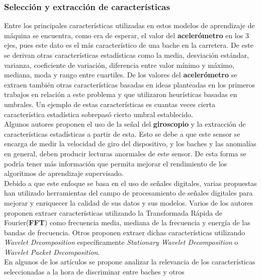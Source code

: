 		\subsubsection{Selección y extracción de características}
			Entre los principales características utilizadas en estos modelos de aprendizaje de máquina se encuentra, como era de esperar, el valor 
			del \textbf{acelerómetro} en los 3 ejes, pues este dato es el más característico de una bache en la carretera. De este se derivan otras
			características estadísticas como la media, desviación estándar, varianza, coeficiente de variación, diferencia entre valor mínimo y
			máximo, mediana, moda y rango entre cuartiles. De los valores del \textbf{acelerómetro} se extraen también otras características basadas en ideas planteadas en los primeros
			trabajos en relación a este problema y que utilizaron heurísticas basadas en umbrales. Un ejemplo de estas características es cuantas  veces
			cierta característica estadística sobrepasó cierto umbral establecido.\\
			\indent Algunos autores proponen el uso de la señal del \textbf{giroscopio} y la extracción de características estadísticas a partir de esta.
			Esto se debe a que este sensor se encarga de medir la velocidad de giro del dispositivo, y los baches y las anomalías en general, deben producir
			lecturas anormales de este sensor. De esta forma se podría tener más información que permita mejorar el rendimiento de los algoritmos de aprendizaje
			supervisado.\\
			\indent Debido a que este enfoque se basa en el uso de señales digitales, varias propuestas han utilizado herramientas del campo de procesamiento
			de señales digitales para mejorar y enriquecer la calidad de sus datos y sus modelos. Varios de los autores proponen extraer características utilizando
			la Transformada Rápida de Fourier(\textbf{FFT}) como frecuencia media, mediana de la frecuencia y energía de las bandas de frecuencia. Otros proponen extraer dichas características utilizando \emph{Wavelet Decomposition} específicamente \emph{Stationary Wavelet
			Decomposition} o \emph{Wavelet Packet Decomposition}.\\
			\indent En algunos de los artículos se propone analizar la relevancia de los características seleccionadas a la hora de discriminar entre baches y otros
